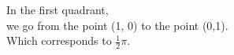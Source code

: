 \documentclass[preview]{standalone}
\begin{document}
\begin{center}
In the first quadrant,\\ we go from the point (1, 0) to the point (0,1). \\ Which corresponds to $\frac{1}{2} \pi$.
\end{center}
\end{document}
